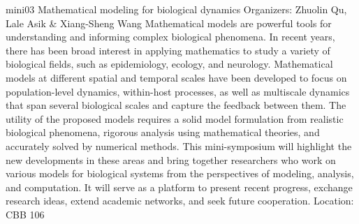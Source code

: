 \mini
{mini03}
{Mathematical modeling for biological dynamics}
{Organizers: Zhuolin Qu, Lale Asik \& Xiang-Sheng Wang}
{Mathematical models are powerful tools for understanding and informing complex biological phenomena. In recent years, there has been broad interest in applying mathematics to study a variety of biological fields, such as epidemiology, ecology, and neurology. Mathematical models at different spatial and temporal scales have been developed to focus on population-level dynamics, within-host processes, as well as multiscale dynamics that span several biological scales and capture the feedback between them. The utility of the proposed models requires a solid model formulation from realistic biological phenomena, rigorous analysis using mathematical theories, and accurately solved by numerical methods. This mini-symposium will highlight the new developments in these areas and bring together researchers who work on various models for biological systems from the perspectives of modeling, analysis, and computation. It will serve as a platform to present recent progress, exchange research ideas, extend academic networks, and seek future cooperation.}
{Location: CBB 106}

